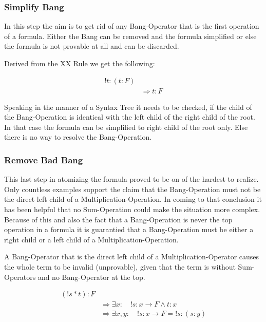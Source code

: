 

\subsubsection{Simplify Bang}
In this step the aim is to get rid of any Bang-Operator that is the first operation of a formula. Either the Bang can be removed and the formula simplified or else the formula is not provable at all and can be discarded.

Derived from the XX Rule we get the following:

\begin{equation}\label{sb}
\begin{split}
	!t:(t:F)  \\
	& \Rightarrow t: F
\end{split}
\end{equation}



Speaking in the manner of a Syntax Tree it needs to be checked, if the child of the Bang-Operation is identical with the left child of the right child of the root. In that case the formula can be simplified to right child of the root only. Else there is no way to resolve the Bang-Operation.

\subsubsection{Remove Bad Bang}
This last step in atomizing the formula proved to be on of the hardest to realize. Only countless examples support the claim that the Bang-Operation must not be the direct left child of a Multiplication-Operation. In coming to that conclusion it has been helpful that no Sum-Operation could make the situation more complex. Because of this and also the fact that a Bang-Operation is never the top operation in a formula it is guarantied that a Bang-Operation must be either a right child or a left child of a Multiplication-Operation.

\begin{assertion}
A Bang-Operator that is the direct left child of a Multiplication-Operator causes the whole term to be invalid (unprovable), given that the term is without Sum-Operators and no Bang-Operator at the top.
\end{assertion}

\begin{equation}\label{bb}
\begin{split}
	(!s*t):F  \\
	& \Rightarrow \exists x : \quad !s: x \rightarrow F \land t: x\\
	& \Rightarrow \exists x,y : \quad !s: x \rightarrow F = !s:(s:y)
\end{split}
\end{equation}

